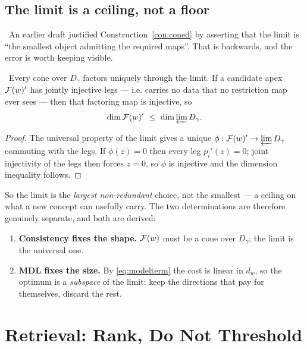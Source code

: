 \section{The limit is a ceiling, not a floor}\label{sec:conesize}

\begin{hon}\Hon
\Refuted\ An earlier draft justified
Construction~\ref{con:coned} by asserting that the limit is ``the
smallest object admitting the required maps''. That is backwards, and
the error is worth keeping visible.
\end{hon}

\begin{proposition}\label{prop:ceiling}
\Proved\ Every cone over $D_\gamma$ factors uniquely through the limit.
If a candidate apex $\mathcal{F}(w)'$ has jointly injective legs --- i.e.
carries no data that no restriction map ever sees --- then that
factoring map is injective, so
\[
  \dim\mathcal{F}(w)'\ \le\ \dim\varprojlim D_\gamma .
\]
\end{proposition}
\begin{proof}
The universal property of the limit gives a unique
$\phi:\mathcal{F}(w)'\to\varprojlim D_\gamma$ commuting with the legs. If
$\phi(z)=0$ then every leg $p_i'(z)=0$; joint injectivity of the legs
then forces $z=0$, so $\phi$ is injective and the dimension inequality
follows.
\end{proof}

So the limit is the \emph{largest non-redundant} choice, not the
smallest --- a ceiling on what a new concept can usefully carry. The two
determinations are therefore genuinely separate, and both are derived:

\begin{enumerate}
  \item \textbf{Consistency fixes the shape.} $\mathcal{F}(w)$ must be a cone
        over $D_\gamma$; the limit is the universal one.
  \item \textbf{MDL fixes the size.} By \eqref{eq:modelterm} the cost is
        linear in $d_w$, so the optimum is a \emph{subspace} of the
        limit: keep the directions that pay for themselves, discard the
        rest.
\end{enumerate}

\chapter{Retrieval: Rank, Do Not Threshold}\label{ch:retrieval}

